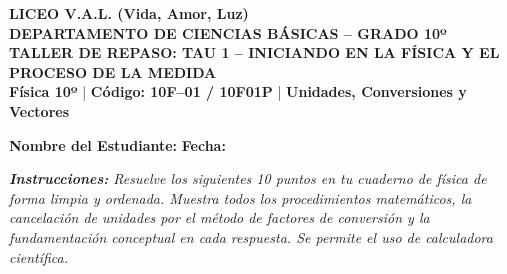 \documentclass[11pt, letterpaper]{article}
\begin{document}
	
	\begin{center}
		{\Large \textbf{\color{valblue} LICEO V.A.L. (Vida, Amor, Luz)}}\\[0.1cm]
		{\large \textbf{DEPARTAMENTO DE CIENCIAS BÁSICAS -- GRADO 10º}}\\[0.1cm]
		{\large \textbf{TALLER DE REPASO: TAU 1 -- INICIANDO EN LA FÍSICA Y EL PROCESO DE LA MEDIDA}}\\[0.1cm]
		{\small \textbf{Física 10º} \quad | \quad \textbf{Código: 10F--01 / 10F01P} \quad | \quad \textbf{Unidades, Conversiones y Vectores}}
	\end{center}
	
	\vspace{0.2cm}
	\noindent \textbf{Nombre del Estudiante:} \underline{\hspace{8.5cm}} \hfill \textbf{Fecha:} \underline{\hspace{3cm}}
	
	\vspace{0.3cm}
	\begin{tcolorbox}[colback=valgray, colframe=valdark, arc=1mm, boxrule=0.8pt]
		\textit{\textbf{Instrucciones:} Resuelve los siguientes 10 puntos en tu cuaderno de física de forma limpia y ordenada. Muestra todos los procedimientos matemáticos, la cancelación de unidades por el método de factores de conversión y la fundamentación conceptual en cada respuesta. Se permite el uso de calculadora científica.}
	\end{tcolorbox}
	\vspace{0.3cm}
	
\end{document}
